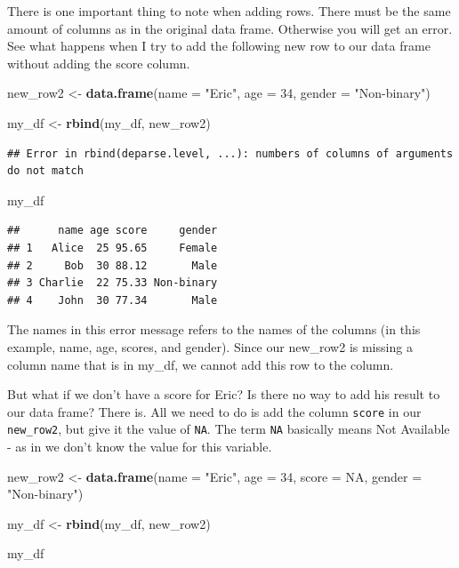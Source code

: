 \documentclass[
]{book}
\newenvironment{Shaded}{\begin{snugshade}}{\end{snugshade}}
\newcommand{\AttributeTok}[1]{\textcolor[rgb]{0.13,0.29,0.53}{#1}}
\newcommand{\ConstantTok}[1]{\textcolor[rgb]{0.56,0.35,0.01}{#1}}
\newcommand{\DecValTok}[1]{\textcolor[rgb]{0.00,0.00,0.81}{#1}}
\newcommand{\FunctionTok}[1]{\textcolor[rgb]{0.13,0.29,0.53}{\textbf{#1}}}
\newcommand{\NormalTok}[1]{#1}
\newcommand{\OtherTok}[1]{\textcolor[rgb]{0.56,0.35,0.01}{#1}}
\newcommand{\StringTok}[1]{\textcolor[rgb]{0.31,0.60,0.02}{#1}}
\begin{document}
There is one important thing to note when adding rows. There must be the same amount of columns as in the original data frame. Otherwise you will get an error. See what happens when I try to add the following new row to our data frame without adding the score column.

\begin{Shaded}
\begin{Highlighting}[]
\NormalTok{new\_row2 }\OtherTok{\textless{}{-}} \FunctionTok{data.frame}\NormalTok{(}\AttributeTok{name =} \StringTok{"Eric"}\NormalTok{, }\AttributeTok{age =} \DecValTok{34}\NormalTok{, }\AttributeTok{gender =} \StringTok{"Non{-}binary"}\NormalTok{)}

\NormalTok{my\_df }\OtherTok{\textless{}{-}} \FunctionTok{rbind}\NormalTok{(my\_df, new\_row2)}
\end{Highlighting}
\end{Shaded}

\begin{verbatim}
## Error in rbind(deparse.level, ...): numbers of columns of arguments do not match
\end{verbatim}

\begin{Shaded}
\begin{Highlighting}[]
\NormalTok{my\_df}
\end{Highlighting}
\end{Shaded}

\begin{verbatim}
##      name age score     gender
## 1   Alice  25 95.65     Female
## 2     Bob  30 88.12       Male
## 3 Charlie  22 75.33 Non-binary
## 4    John  30 77.34       Male
\end{verbatim}

The names in this error message refers to the names of the columns (in this example, name, age, scores, and gender). Since our new\_row2 is missing a column name that is in my\_df, we cannot add this row to the column.

But what if we don't have a score for Eric? Is there no way to add his result to our data frame? There is. All we need to do is add the column \texttt{score} in our \texttt{new\_row2}, but give it the value of \texttt{NA}. The term \texttt{NA} basically means Not Available - as in we don't know the value for this variable.

\begin{Shaded}
\begin{Highlighting}[]
\NormalTok{new\_row2 }\OtherTok{\textless{}{-}} \FunctionTok{data.frame}\NormalTok{(}\AttributeTok{name =} \StringTok{"Eric"}\NormalTok{, }\AttributeTok{age =} \DecValTok{34}\NormalTok{, }\AttributeTok{score =} \ConstantTok{NA}\NormalTok{, }\AttributeTok{gender =} \StringTok{"Non{-}binary"}\NormalTok{)}

\NormalTok{my\_df }\OtherTok{\textless{}{-}} \FunctionTok{rbind}\NormalTok{(my\_df, new\_row2)}

\NormalTok{my\_df}
\end{Highlighting}
\end{Shaded}
\end{document}
